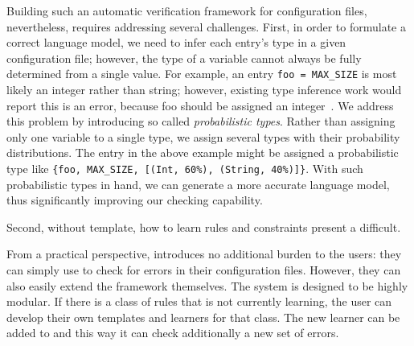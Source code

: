 Building such an automatic verification framework for
configuration files, nevertheless, requires addressing several challenges. 
First, in order to formulate a correct language model, 
we need to infer each entry's type in a given configuration file;
however, the type of a variable cannot always be fully determined 
from a single value. 
For example, an entry {\tt foo = MAX\_SIZE} is most likely
an integer rather than string; however, existing type inference 
work would report this is an error, because foo should be assigned
an integer~\cite{zhang14encore}. We address this problem by introducing 
so called {\emph{probabilistic types}}.
Rather than assigning only one variable to a single type, 
we assign several types with their probability distributions. 
The entry in the above example might be assigned 
a probabilistic type like 
{\tt \{foo, MAX\_SIZE, [(Int, 60\%), (String, 40\%)]\}}.
With such probabilistic types in hand,
we can generate a more accurate language model,
thus significantly improving our checking capability.

Second, without template, how to learn rules and constraints present
a difficult. 


From a practical perspective, 
\app introduces no additional burden 
to the users: they can simply use \app to check for errors in their
configuration files. However, they can also easily extend the framework
themselves. The system is designed to be highly modular. If there is a
class of rules that \app is not currently learning, the user can develop
their own templates and learners for that class. The new learner can be
added to \app and this way it can check additionally a new set of
errors.

